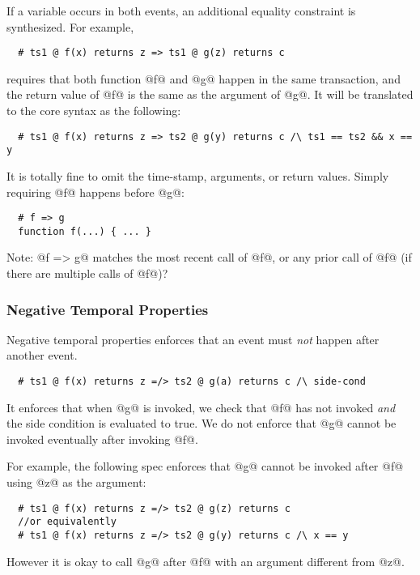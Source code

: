 \documentclass[acmsmall,review,anonymous]{acmart}\settopmatter{printfolios=true,printccs=false,printacmref=false}
\begin{document}
If a variable occurs in both events, an additional equality constraint
is synthesized.  For example,
\begin{lstlisting}
  # ts1 @ f(x) returns z => ts1 @ g(z) returns c
\end{lstlisting}
requires that both function @f@ and @g@ happen in the same transaction,
and the return value of @f@ is the same as the argument of @g@.
It will be translated to the core syntax as the following:
\begin{lstlisting}
  # ts1 @ f(x) returns z => ts2 @ g(y) returns c /\ ts1 == ts2 && x == y
\end{lstlisting}

It is totally fine to omit the time-stamp, arguments, or return values.
Simply requiring @f@ happens before @g@:
\begin{lstlisting}
  # f => g
  function f(...) { ... }
\end{lstlisting}


Note: @f => g@ matches the most recent call of @f@,
or any prior call of @f@ (if there are multiple calls of @f@)?



\subsubsection{Negative Temporal Properties}

Negative temporal properties enforces that an event must \emph{not}
happen after another event.

\begin{lstlisting}
  # ts1 @ f(x) returns z =/> ts2 @ g(a) returns c /\ side-cond
\end{lstlisting}
It enforces that when @g@ is invoked, we check that @f@ has not invoked
\emph{and} the side condition is evaluated to true.
We do not enforce that @g@ cannot be invoked eventually
after invoking @f@.

For example, the following spec enforces that @g@ cannot be
invoked after @f@ using @z@ as the argument:
\begin{lstlisting}
  # ts1 @ f(x) returns z =/> ts2 @ g(z) returns c
  //or equivalently
  # ts1 @ f(x) returns z =/> ts2 @ g(y) returns c /\ x == y
\end{lstlisting}
However it is okay to call @g@ after @f@ with an argument different from @z@.
\end{document}
